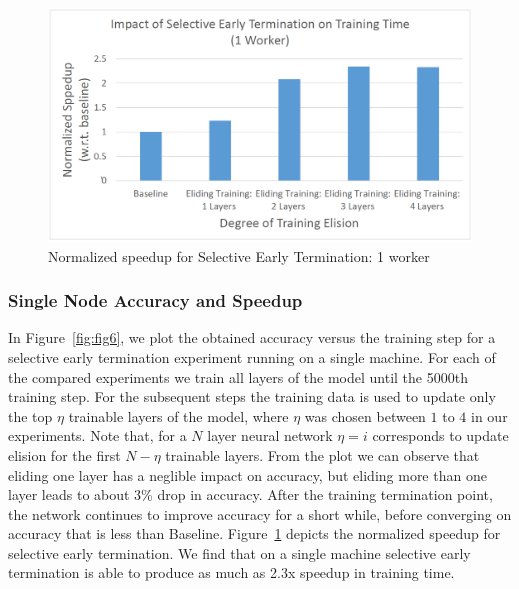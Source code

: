 \begin{figure}[t]
	\centering
	\includegraphics[width=1.0\columnwidth]{figures/fig7.PNG}
	\caption{Normalized speedup for Selective Early Termination: 1 worker}
	\label{fig:fig7}
\end{figure}

\subsubsection{Single Node Accuracy and Speedup} 
In Figure~\ref{fig:fig6}, we plot the obtained accuracy versus the training step for a selective early termination experiment running on a single machine. For each of the compared experiments we train all layers of the model until the 5000th training step. For the subsequent steps the training data is used to update only the top $\eta$ trainable layers of the model, where $\eta$ was chosen between $1$ to $4$ in our experiments. Note that, for a $N$ layer neural network $\eta=i$ corresponds to update elision for the first $N-\eta$ trainable layers. From the plot we can observe that eliding one layer has a neglible impact on accuracy, but eliding more than one layer leads to about 3\% drop in accuracy. After the training termination point, the network continues to improve accuracy for a short while, before converging on accuracy that is less than Baseline. 
Figure~\ref{fig:fig7} depicts the normalized speedup for selective early termination. We find that on a single machine selective early termination is able to produce as much as 2.3x speedup in training time.  


